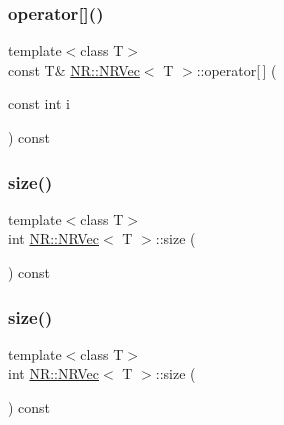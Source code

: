 \mbox{\label{classNR_1_1NRVec_a96caa29f8fb313218804268101c95e1a}} 
\subsubsection{\texorpdfstring{operator[]()}{operator[]()}\hspace{0.1cm}{\footnotesize\ttfamily [6/6]}}
{\footnotesize\ttfamily template$<$class T$>$ \\
const T\& \mbox{\hyperlink{classNR_1_1NRVec}{N\+R\+::\+N\+R\+Vec}}$<$ T $>$\+::operator\mbox{[}$\,$\mbox{]} (\begin{DoxyParamCaption}\item[{const int}]{i }\end{DoxyParamCaption}) const\hspace{0.3cm}{\ttfamily [inline]}}

\mbox{\label{classNR_1_1NRVec_ab0dfb2d7ce74022fa0ce42138f4a224b}} 
\subsubsection{\texorpdfstring{size()}{size()}\hspace{0.1cm}{\footnotesize\ttfamily [1/3]}}
{\footnotesize\ttfamily template$<$class T$>$ \\
int \mbox{\hyperlink{classNR_1_1NRVec}{N\+R\+::\+N\+R\+Vec}}$<$ T $>$\+::size (\begin{DoxyParamCaption}{ }\end{DoxyParamCaption}) const\hspace{0.3cm}{\ttfamily [inline]}}

\mbox{\label{classNR_1_1NRVec_ab0dfb2d7ce74022fa0ce42138f4a224b}} 
\subsubsection{\texorpdfstring{size()}{size()}\hspace{0.1cm}{\footnotesize\ttfamily [2/3]}}
{\footnotesize\ttfamily template$<$class T$>$ \\
int \mbox{\hyperlink{classNR_1_1NRVec}{N\+R\+::\+N\+R\+Vec}}$<$ T $>$\+::size (\begin{DoxyParamCaption}{ }\end{DoxyParamCaption}) const\hspace{0.3cm}{\ttfamily [inline]}}

